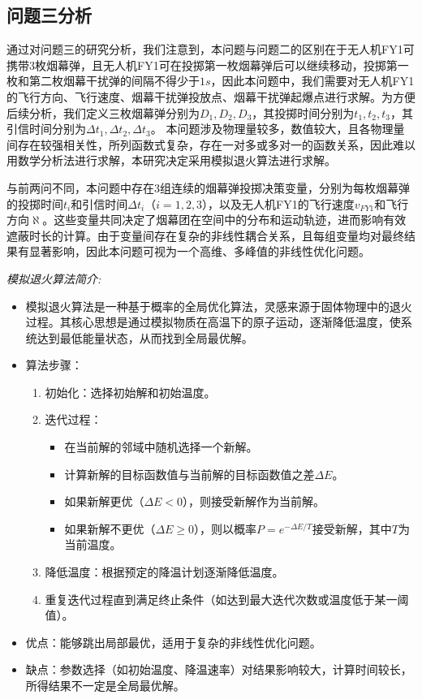 \documentclass{article}
\begin{document}
\subsection{问题三分析}
通过对问题三的研究分析，我们注意到，本问题与问题二的区别在于无人机FY1可携带3枚烟幕弹，且无人机FY1可在投掷第一枚烟幕弹后可以继续移动，投掷第一枚和第二枚烟幕干扰弹的间隔不得少于$1s$，因此本问题中，我们需要对无人机FY1的飞行方向、飞行速度、烟幕干扰弹投放点、烟幕干扰弹起爆点进行求解。为方便后续分析，我们定义三枚烟幕弹分别为$D_1,D_2,D_3$，其投掷时间分别为$t_1,t_2,t_3$，其引信时间分别为$\Delta t_1,\Delta t_2,\Delta t_3$。
本问题涉及物理量较多，数值较大，且各物理量间存在较强相关性，所列函数式复杂，存在一对多或多对一的函数关系，因此难以用数学分析法进行求解，本研究决定采用模拟退火算法进行求解。

与前两问不同，本问题中存在3组连续的烟幕弹投掷决策变量，分别为每枚烟幕弹的投掷时间$t_i$和引信时间$\Delta t_i$（$i=1,2,3$），以及无人机FY1的飞行速度$v_{FY1}$和飞行方向$\aleph$。这些变量共同决定了烟幕团在空间中的分布和运动轨迹，进而影响有效遮蔽时长的计算。由于变量间存在复杂的非线性耦合关系，且每组变量均对最终结果有显著影响，因此本问题可视为一个高维、多峰值的非线性优化问题。

\textit{模拟退火算法简介:}
\begin{itemize}
    \item 模拟退火算法是一种基于概率的全局优化算法，灵感来源于固体物理中的退火过程。其核心思想是通过模拟物质在高温下的原子运动，逐渐降低温度，使系统达到最低能量状态，从而找到全局最优解。
    \item 算法步骤：
    \begin{enumerate}
        \item 初始化：选择初始解和初始温度。
        \item 迭代过程：
        \begin{itemize}
            \item 在当前解的邻域中随机选择一个新解。
            \item 计算新解的目标函数值与当前解的目标函数值之差$\Delta E$。
            \item 如果新解更优（$\Delta E < 0$），则接受新解作为当前解。
            \item 如果新解不更优（$\Delta E \geq 0$），则以概率$P = e^{-\Delta E / T}$接受新解，其中$T$为当前温度。
        \end{itemize}
        \item 降低温度：根据预定的降温计划逐渐降低温度。
        \item 重复迭代过程直到满足终止条件（如达到最大迭代次数或温度低于某一阈值）。
    \end{enumerate}
    \item 优点：能够跳出局部最优，适用于复杂的非线性优化问题。
    \item 缺点：参数选择（如初始温度、降温速率）对结果影响较大，计算时间较长，所得结果不一定是全局最优解。
\end{itemize}
\end{document}

